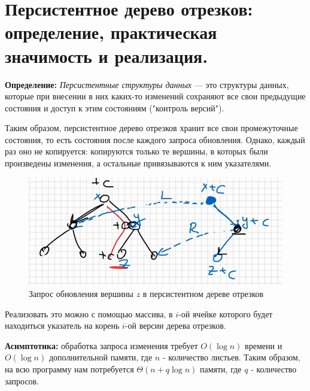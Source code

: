\setcounter{section}{64}
\section{Персистентное дерево отрезков: определение, практическая значимость и реализация.}
\par \textbf{Определение:} \textit{Персистентные структуры данных} — это структуры данных, которые при внесении в них каких-то изменений сохраняют все свои предыдущие состояния и доступ к этим состояниям ("контроль версий").
\par Таким образом, персистентное дерево отрезков хранит все свои промежуточные состояния, то есть состояния после каждого запроса обновления. Однако, каждый раз оно не копируется: копируются только те вершины, в которых были произведены изменения, а остальные привязываются к ним указателями.
\begin{figure}[h]
    \centering
    \includegraphics[scale=0.7]{images/65-66_persistent}
    \caption{Запрос обновления вершины $z$ в персистентном дереве отрезков}
\end{figure}
\par Реализовать это можно с помощью массива, в $i$-ой ячейке которого будет находиться указатель на корень $i$-ой версии дерева отрезков.
\par \textbf{Асимптотика:} обработка запроса изменения требует $O(\log n)$ времени и $O(\log n)$ дополнительной памяти, где $n$ - количество листьев. Таким образом, на всю программу нам потребуется $\Theta(n+q \log n)$ памяти, где $q$ - количество запросов.


